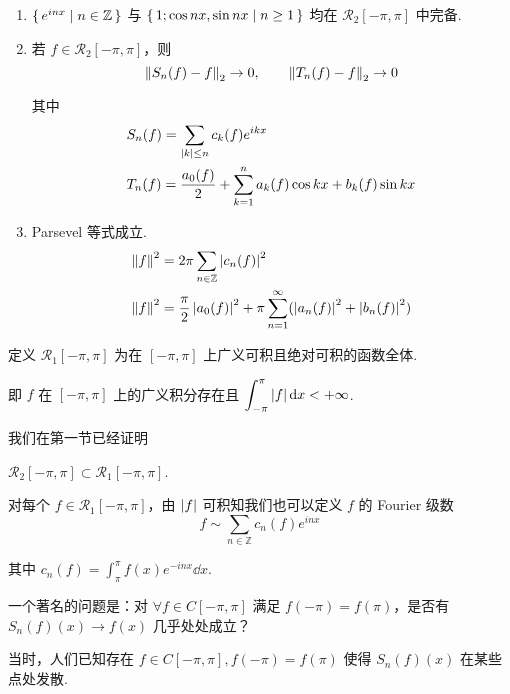 \begin{theorem}
    \begin{enumerate}
        \item $\set{e^{inx}|n\in\mathbb{Z}}$ 与 $\set{1;\cos nx,\sin nx|n\ge 1}$ 均在 $\mathcal{R}_2[-\pi,\pi]$ 中完备.
        
        \item 若 $f\in \mathcal{R}_2[-\pi,\pi]$，则
$$
\left\lVert{S_n(f)-f}\right\rVert_2\to 0,\qquad\left\lVert{T_n(f)-f}\right\rVert_2\to 0
$$

        其中
$$
\begin{aligned}
    &S_n(f)=\sum_{\left\lvert{k}\right\rvert\le n}c_k(f)e^{ikx}\\
    &T_n(f)=\frac{a_0(f)}{2}+\sum_{k=1}^na_k(f)\cos kx+b_k(f)\sin kx
\end{aligned}
$$

        \item Parsevel 等式成立.
$$
\begin{aligned}
    \left\lVert{f}\right\rVert^2&=2\pi\sum_{n\in\mathbb{Z}}\left\lvert{c_n(f)}\right\rvert^2\\
    \left\lVert{f}\right\rVert^2&=\frac{\pi}{2}\left\lvert{a_0(f)}\right\rvert^2+\pi\sum_{n=1}^\infty(\left\lvert{a_n(f)}\right\rvert^2+\left\lvert{b_n(f)}\right\rvert^2)
\end{aligned}
$$
    \end{enumerate}
\end{theorem}



定义 $\mathcal{R}_1[-\pi,\pi]$ 为在 $[-\pi,\pi]$ 上广义可积且绝对可积的函数全体.

即 $f$ 在 $[-\pi,\pi]$ 上的广义积分存在且 $\displaystyle\int_{-\pi}^{\pi}\left\lvert{f}\right\rvert\mathrm{d} x<+\infty$.

我们在第一节已经证明

\begin{property}
    $\mathcal{R}_2[-\pi,\pi]\subset \mathcal{R}_1[-\pi,\pi]$.
\end{property}

对每个 $f\in \mathcal{R}_1[-\pi,\pi]$，由 $\left\lvert{f}\right\rvert$ 可积知我们也可以定义 $f$ 的 Fourier 级数
$$
f\sim\sum_{n\in\mathbb{Z}}c_n(f)e^{inx}
$$

其中 $c_n(f)=\displaystyle\int_{\pi}^{\pi}f(x)e^{-inx}\dd x$.

一个著名的问题是：对 $\forall f\in C[-\pi,\pi]$ 满足 $f(-\pi)=f(\pi)$，是否有 $S_n(f)(x)\to f(x)$ 几乎处处成立？

当时，人们已知存在 $f\in C[-\pi,\pi],f(-\pi)=f(\pi)$ 使得 $S_n(f)(x)$ 在某些点处发散.

